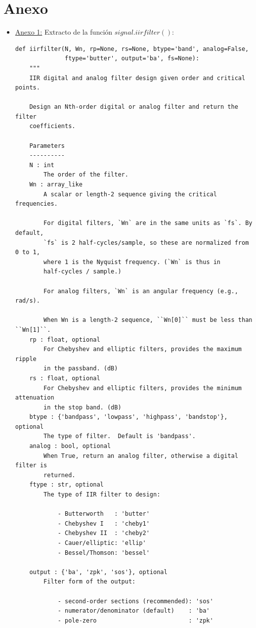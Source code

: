 \documentclass[12pt,a4paper]{article}
\begin{document}
\section{Anexo}
\begin{itemize}
    \item \underline{Anexo 1:} Extracto de la función $signal.iirfilter()$:
    \begin{verbatim}
def iirfilter(N, Wn, rp=None, rs=None, btype='band', analog=False,
              ftype='butter', output='ba', fs=None):
    """
    IIR digital and analog filter design given order and critical points.

    Design an Nth-order digital or analog filter and return the filter
    coefficients.

    Parameters
    ----------
    N : int
        The order of the filter.
    Wn : array_like
        A scalar or length-2 sequence giving the critical frequencies.

        For digital filters, `Wn` are in the same units as `fs`. By default,
        `fs` is 2 half-cycles/sample, so these are normalized from 0 to 1,
        where 1 is the Nyquist frequency. (`Wn` is thus in
        half-cycles / sample.)

        For analog filters, `Wn` is an angular frequency (e.g., rad/s).

        When Wn is a length-2 sequence, ``Wn[0]`` must be less than ``Wn[1]``.
    rp : float, optional
        For Chebyshev and elliptic filters, provides the maximum ripple
        in the passband. (dB)
    rs : float, optional
        For Chebyshev and elliptic filters, provides the minimum attenuation
        in the stop band. (dB)
    btype : {'bandpass', 'lowpass', 'highpass', 'bandstop'}, optional
        The type of filter.  Default is 'bandpass'.
    analog : bool, optional
        When True, return an analog filter, otherwise a digital filter is
        returned.
    ftype : str, optional
        The type of IIR filter to design:

            - Butterworth   : 'butter'
            - Chebyshev I   : 'cheby1'
            - Chebyshev II  : 'cheby2'
            - Cauer/elliptic: 'ellip'
            - Bessel/Thomson: 'bessel'

    output : {'ba', 'zpk', 'sos'}, optional
        Filter form of the output:

            - second-order sections (recommended): 'sos'
            - numerator/denominator (default)    : 'ba'
            - pole-zero                          : 'zpk'


\end{verbatim}
\end{itemize}
\end{document}
